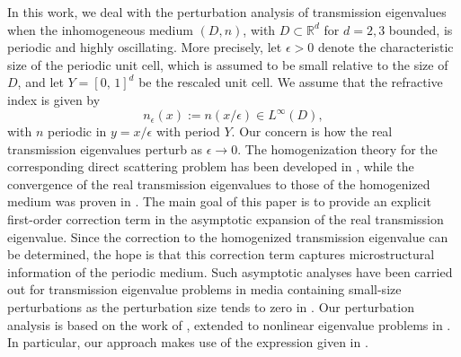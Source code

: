 \documentclass[12pt]{article}
\begin{document}
\medskip
\noindent
In this work, we deal with the perturbation analysis of transmission eigenvalues when the inhomogeneous medium \((D,n)\), with \(D \subset \mathbb{R}^d\) for \(d=2,3\) bounded, is periodic and highly oscillating. More precisely, let \(\epsilon>0\) denote the characteristic size of the periodic unit cell, which is assumed to be small relative to the size of \(D\), and let \(Y=[0,\,1]^d\) be the rescaled unit cell. We assume that the refractive index is given by  
\[
n_\epsilon(x):=n(x/\epsilon) \in L^\infty(D),
\]  
with \(n\) periodic in \(y=x/\epsilon\) with period \(Y\).  
Our concern is how the real transmission eigenvalues perturb as \(\epsilon \to 0\). The homogenization theory for the corresponding direct scattering problem has been developed in \cite{CaMoPa,CaGuMoPa}, while the convergence of the real transmission eigenvalues to those of the homogenized medium was proven in \cite{CaHaHa}. The main goal of this paper is to provide an explicit first-order correction term in the asymptotic expansion of the real transmission eigenvalue. Since the correction to the homogenized transmission eigenvalue can be determined, the hope is that this correction term captures microstructural information of the periodic medium.   Such asymptotic analyses have been carried out for transmission eigenvalue problems in media containing small-size perturbations as the perturbation size tends to zero in \cite{CaHaMo,CaMoRo}. Our perturbation analysis is based on the work of \cite{Os}, extended to nonlinear eigenvalue problems in \cite{Mo,FuMo}. In particular, our approach makes use of the expression given in \cite{FuMo}.  
\end{document}
